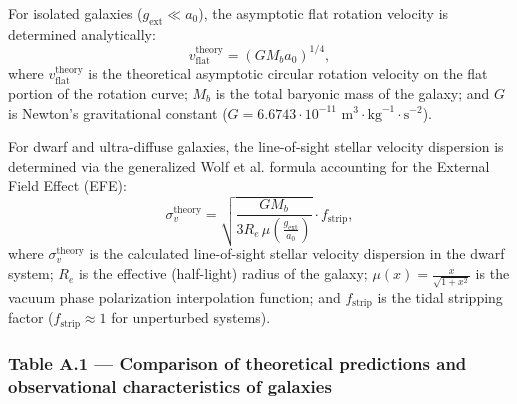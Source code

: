 For isolated galaxies ($g_{\text{ext}} \ll a_0$), the asymptotic flat rotation velocity is determined analytically:
\begin{equation}\label{eq:A.2}\tag{A.2}
v_{\text{flat}}^{\text{theory}} = \left( G M_b a_0 \right)^{1/4},
\end{equation}
where $v_{\text{flat}}^{\text{theory}}$ is the theoretical asymptotic circular rotation velocity on the flat portion of the rotation curve; $M_b$ is the total baryonic mass of the galaxy; and $G$ is Newton's gravitational constant ($G = 6.6743 \cdot 10^{-11}\text{ m}^3\cdot\text{kg}^{-1}\cdot\text{s}^{-2}$).

For dwarf and ultra-diffuse galaxies, the line-of-sight stellar velocity dispersion is determined via the generalized Wolf et al. formula \cite{ref29} accounting for the External Field Effect (EFE):
\begin{equation}\label{eq:A.3}\tag{A.3}
\sigma_v^{\text{theory}} = \sqrt{\frac{G M_b}{3 R_e \, \mu\left( \frac{g_{\text{ext}}}{a_0} \right)}} \cdot f_{\text{strip}},
\end{equation}
where $\sigma_v^{\text{theory}}$ is the calculated line-of-sight stellar velocity dispersion in the dwarf system; $R_e$ is the effective (half-light) radius of the galaxy; $\mu(x) = \frac{x}{\sqrt{1+x^2}}$ is the vacuum phase polarization interpolation function; and $f_{\text{strip}}$ is the tidal stripping factor ($f_{\text{strip}} \approx 1$ for unperturbed systems).

\subsubsection*{Table A.1 --- Comparison of theoretical predictions and observational characteristics of galaxies}

